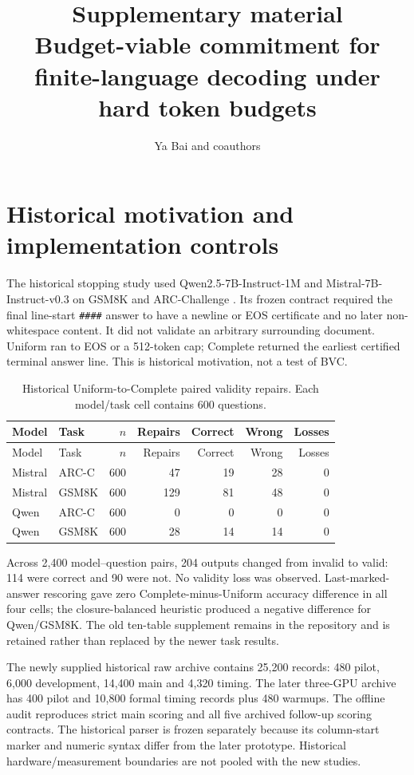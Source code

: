 \documentclass[12pt,a4paper]{article}
\title{Supplementary material\\Budget-viable commitment for finite-language decoding under hard token budgets}
\author{Ya Bai and coauthors}
\date{}
\newcommand{\code}[1]{\texttt{#1}}
\begin{document}
\maketitle
\section{Historical motivation and implementation controls}
The historical stopping study used Qwen2.5-7B-Instruct-1M and Mistral-7B-Instruct-v0.3 on GSM8K and ARC-Challenge \citep{yang2025,mistral2024,cobbe2021,clark2018}. Its frozen contract required the final line-start \code{\#\#\#\#} answer to have a newline or EOS certificate and no later non-whitespace content. It did not validate an arbitrary surrounding document. Uniform ran to EOS or a 512-token cap; Complete returned the earliest certified terminal answer line. This is historical motivation, not a test of BVC.
\begin{longtable}{@{}llrrrrr@{}}
\caption{Historical Uniform-to-Complete paired validity repairs. Each model/task cell contains 600 questions.}\label{tab:historical}\\
\toprule
Model & Task & $n$ & Repairs & Correct & Wrong & Losses \\
\midrule
\endfirsthead
\toprule
Model & Task & $n$ & Repairs & Correct & Wrong & Losses \\
\midrule
\endhead
Mistral & ARC-C & 600 & 47 & 19 & 28 & 0 \\
Mistral & GSM8K & 600 & 129 & 81 & 48 & 0 \\
Qwen & ARC-C & 600 & 0 & 0 & 0 & 0 \\
Qwen & GSM8K & 600 & 28 & 14 & 14 & 0 \\
\bottomrule
\end{longtable}

Across 2,400 model--question pairs, 204 outputs changed from invalid to valid: 114 were correct and 90 were not. No validity loss was observed. Last-marked-answer rescoring gave zero Complete-minus-Uniform accuracy difference in all four cells; the closure-balanced heuristic produced a negative difference for Qwen/GSM8K. The old ten-table supplement remains in the repository and is retained rather than replaced by the newer task results.

The newly supplied historical raw archive contains 25,200 records: 480 pilot, 6,000 development, 14,400 main and 4,320 timing. The later three-GPU archive has 400 pilot and 10,800 formal timing records plus 480 warmups. The offline audit reproduces strict main scoring and all five archived follow-up scoring contracts. The historical parser is frozen separately because its column-start marker and numeric syntax differ from the later prototype. Historical hardware/measurement boundaries are not pooled with the new studies.
\end{document}
